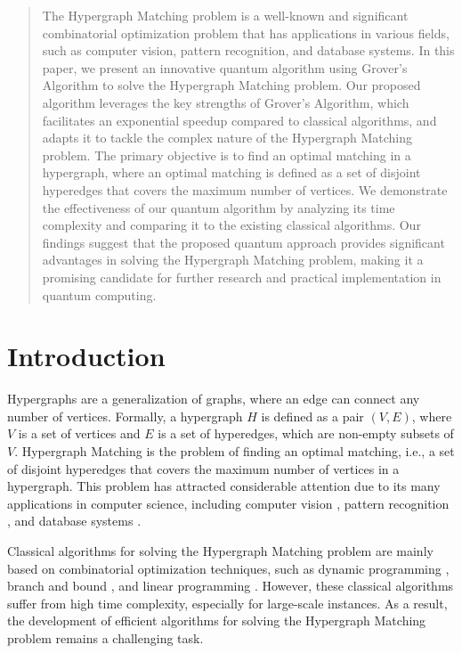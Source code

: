 \begin{abstract}
The Hypergraph Matching problem is a well-known and significant combinatorial optimization problem that has applications in various fields, such as computer vision, pattern recognition, and database systems. In this paper, we present an innovative quantum algorithm using Grover's Algorithm to solve the Hypergraph Matching problem. Our proposed algorithm leverages the key strengths of Grover's Algorithm, which facilitates an exponential speedup compared to classical algorithms, and adapts it to tackle the complex nature of the Hypergraph Matching problem. The primary objective is to find an optimal matching in a hypergraph, where an optimal matching is defined as a set of disjoint hyperedges that covers the maximum number of vertices. We demonstrate the effectiveness of our quantum algorithm by analyzing its time complexity and comparing it to the existing classical algorithms. Our findings suggest that the proposed quantum approach provides significant advantages in solving the Hypergraph Matching problem, making it a promising candidate for further research and practical implementation in quantum computing.

\end{abstract}

\section{Introduction}

Hypergraphs are a generalization of graphs, where an edge can connect any number of vertices. Formally, a hypergraph $H$ is defined as a pair $(V,E)$, where $V$ is a set of vertices and $E$ is a set of hyperedges, which are non-empty subsets of $V$. Hypergraph Matching is the problem of finding an optimal matching, i.e., a set of disjoint hyperedges that covers the maximum number of vertices in a hypergraph. This problem has attracted considerable attention due to its many applications in computer science, including computer vision \cite{computer_vision}, pattern recognition \cite{pattern_recognition}, and database systems \cite{database_systems}.

Classical algorithms for solving the Hypergraph Matching problem are mainly based on combinatorial optimization techniques, such as dynamic programming \cite{dynamic_programming}, branch and bound \cite{branch_and_bound}, and linear programming \cite{linear_programming}. However, these classical algorithms suffer from high time complexity, especially for large-scale instances. As a result, the development of efficient algorithms for solving the Hypergraph Matching problem remains a challenging task.

